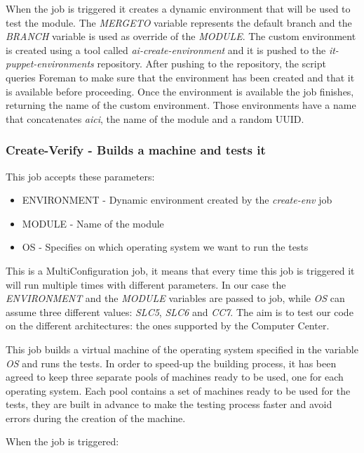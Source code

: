 When the job is triggered it creates a dynamic environment that will be
used to test the module. The \textit{MERGETO} variable represents the
default branch and the \textit{BRANCH} variable is used as override of the
\textit{MODULE}. The custom environment is created using a tool called
\textit{ai-create-environment} and it is pushed to the
\textit{it-puppet-environments} repository. After pushing to the
repository, the script queries Foreman to make sure that the environment
has been created and that it is available before proceeding. Once the
environment is available the job finishes, returning the name of the
custom environment. Those environments have a name that concatenates
\textit{aici}, the name of the module and a random UUID.

\subsubsection{Create-Verify - Builds a machine and tests it}

This job accepts these parameters:

\begin{itemize}
  \item ENVIRONMENT - Dynamic environment created by the \textit{create-env} job
  \item MODULE - Name of the module
  \item OS - Specifies on which operating system we want to run the tests
\end{itemize}

This is a MultiConfiguration job, it means that every time this job is
triggered it will run multiple times with different parameters. In our
case the \textit{ENVIRONMENT} and the \textit{MODULE} variables are passed
to job, while \textit{OS} can assume three different values:
\textit{SLC5}, \textit{SLC6} and \textit{CC7}. The aim is to test our code
on the different architectures: the ones supported by the Computer
Center.

This job builds a virtual machine of the operating system specified in the
variable \textit{OS} and runs the tests. In order to speed-up the building
process, it has been agreed to keep three separate pools of machines ready
to be used, one for each operating system. Each pool contains a set of
machines ready to be used for the tests, they are built in advance to make
the testing process faster and avoid errors during the creation of the
machine.

When the job is triggered:

